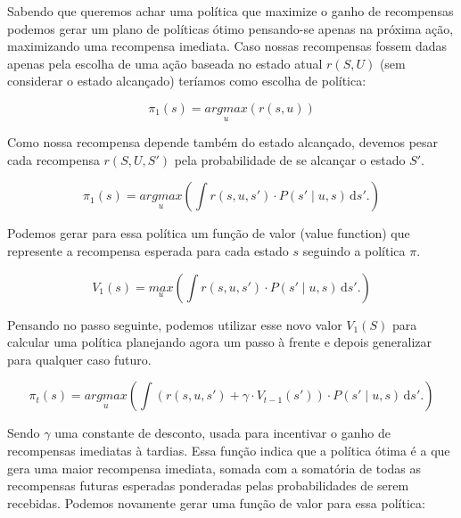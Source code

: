 Sabendo que queremos achar uma política que maximize o ganho de recompensas podemos gerar um plano de políticas ótimo pensando-se apenas na próxima ação, maximizando uma recompensa imediata. Caso nossas recompensas fossem dadas apenas pela escolha de uma ação baseada no estado atual $ r \left( S, U \right) $ (sem considerar o estado alcançado) teríamos como escolha de política:

\begin{equation}
    \pi_1 \left( s \right) = \underset{u}{argmax} \left( r \left( s, u \right) \right)
\end{equation}

Como nossa recompensa depende também do estado alcançado, devemos pesar cada recompensa $ r \left( S, U, S' \right) $ pela probabilidade de se alcançar o estado $ S' $.

\begin{equation}
    \pi_1 \left( s \right) = \underset{u}{argmax} \left( \int \! r \left( s, u, s' \right) \cdot P \left( s' \mid u, s \right) \, \mathrm{d}s'. \right)
\end{equation}

Podemos gerar para essa política um função de valor (value function) que represente a recompensa esperada para cada estado $ s $ seguindo a política $ \pi $.

\begin{equation}
    V_1 \left( s \right) = \underset{u}{max} \left( \int \! r \left( s, u, s' \right) \cdot P \left( s' \mid u, s \right) \, \mathrm{d}s'. \right)
\end{equation}

Pensando no passo seguinte, podemos utilizar esse novo valor $ V_1 \left( S \right) $ para calcular uma política planejando agora um passo à frente e depois generalizar para qualquer caso futuro.

\begin{equation}
    \pi_t \left( s \right) = \underset{u}{argmax} \left( \int \! \left( r \left( s, u, s' \right) + \gamma \cdot V_{t-1} \left( s' \right) \right) \cdot P \left( s' \mid u, s \right) \, \mathrm{d}s'. \right)
\end{equation}

Sendo $ \gamma $ uma constante de desconto, usada para incentivar o ganho de recompensas imediatas à tardias. Essa função indica que a política ótima é a que gera uma maior recompensa imediata, somada com a somatória de todas as recompensas futuras esperadas ponderadas pelas probabilidades de serem recebidas. Podemos novamente gerar uma função de valor para essa política:

